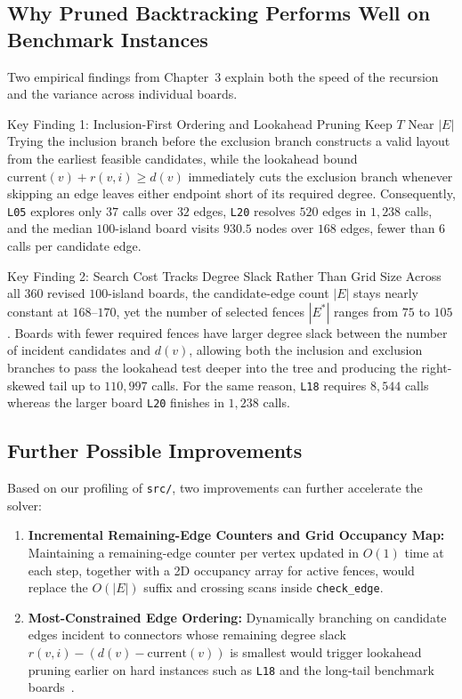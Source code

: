 \documentclass[10pt, a4paper]{article}
\newcommand{\code}[1]{\texttt{\color{primary!90!black}#1}}
\newcommand{\id}[1]{\ensuremath{\mathrm{#1}}}
\begin{document}
\subsection{Why Pruned Backtracking Performs Well on Benchmark Instances}
Two empirical findings from Chapter~3 explain both the speed of the recursion and the variance across individual boards.

\vspace{-0.3em}
\begin{insightbox}{Key Finding 1: Inclusion-First Ordering and Lookahead Pruning Keep $T$ Near $|E|$}
Trying the inclusion branch before the exclusion branch constructs a valid layout from the earliest feasible candidates, while the lookahead bound $\id{current}(v) + r(v,i) \ge d(v)$ immediately cuts the exclusion branch whenever skipping an edge leaves either endpoint short of its required degree. Consequently, \code{L05} explores only $37$ calls over $32$ edges, \code{L20} resolves $520$ edges in $1{,}238$ calls, and the median $100$-island board visits $930.5$ nodes over $168$ edges, fewer than $6$ calls per candidate edge.
\end{insightbox}
\vspace{-0.35em}

\begin{insightbox}{Key Finding 2: Search Cost Tracks Degree Slack Rather Than Grid Size}
Across all $360$ revised $100$-island boards, the candidate-edge count $|E|$ stays nearly constant at $168\text{--}170$, yet the number of selected fences $|E^*|$ ranges from $75$ to $105$. Boards with fewer required fences have larger degree slack between the number of incident candidates and $d(v)$, allowing both the inclusion and exclusion branches to pass the lookahead test deeper into the tree and producing the right-skewed tail up to $110{,}997$ calls. For the same reason, \code{L18} requires $8{,}544$ calls whereas the larger board \code{L20} finishes in $1{,}238$ calls.
\end{insightbox}
\vspace{-0.35em}

\subsection{Further Possible Improvements}
\vspace{-0.15em}
Based on our profiling of \code{src/}, two improvements can further accelerate the solver:
\begin{enumerate}[label=\textbf{\color{primary}\arabic*.}]
  \item \textbf{Incremental Remaining-Edge Counters and Grid Occupancy Map:} Maintaining a remaining-edge counter per vertex updated in $O(1)$ time at each step, together with a 2D occupancy array for active fences, would replace the $O(|E|)$ suffix and crossing scans inside \code{check\_edge}.
  \item \textbf{Most-Constrained Edge Ordering:} Dynamically branching on candidate edges incident to connectors whose remaining degree slack $r(v,i) - (d(v) - \id{current}(v))$ is smallest would trigger lookahead pruning earlier on hard instances such as \code{L18} and the long-tail benchmark boards~\cite{weiss1996}.
\end{enumerate}
\end{document}
